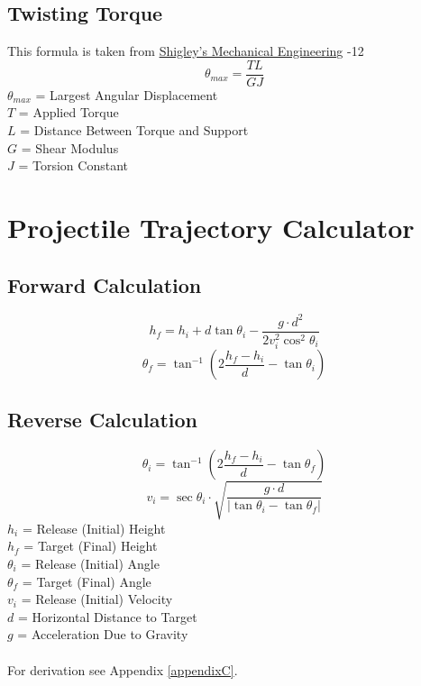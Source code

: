 \documentclass[11pt,a4paper,titlepage]{article}
\begin{document}
	\subsection{Twisting Torque}
	This formula is taken from \href{https://fac.ksu.edu.sa/sites/default/files/mechanical-disgin-shigley.pdf}{Shigley's Mechanical Engineering} -12
	\begin{equation}
		\theta_{max} = \frac{T L}{G J}
	\end{equation}
	$\theta_{max}$ = Largest Angular Displacement \\
	$T$ = Applied Torque \\
	$L$ = Distance Between Torque and Support \\
	$G$ = Shear Modulus \\
	$J$ = Torsion Constant
	
	\newpage
	\section{Projectile Trajectory Calculator}
	\subsection{Forward Calculation}
	\begin{equation} \label{proj_final_height}
		h_f = h_i + d \tan \theta_i - \frac{g \cdot d^2}{2 v_i^2 \cos^2 \theta_i}
	\end{equation}
	\begin{equation} \label{proj_final_angle}
		\theta_f = \tan^{-1} \left( 2 \frac{h_f - h_i}{d} - \tan \theta_i \right)
	\end{equation}
	
	\subsection{Reverse Calculation}
	\begin{equation} \label{proj_init_angle}
		\theta_i = \tan^{-1} \left( 2 \frac{h_f - h_i}{d} - \tan \theta_f \right)
	\end{equation}
	\begin{equation} \label{proj_init_vel}
		v_i = \sec \theta_i \cdot \sqrt{\frac{g \cdot d}{\left| \tan \theta_i - \tan \theta_f \right|}}
	\end{equation}
	$h_i$ = Release (Initial) Height \\
	$h_f$ = Target (Final) Height \\
	$\theta_i$ = Release (Initial) Angle \\
	$\theta_f$ = Target (Final) Angle \\
	$v_i$ = Release	(Initial) Velocity \\
	$d$ = Horizontal Distance to Target \\
	$g$ = Acceleration Due to Gravity\\ \\
	For derivation see Appendix \ref{appendixC}.
	
\end{document}
